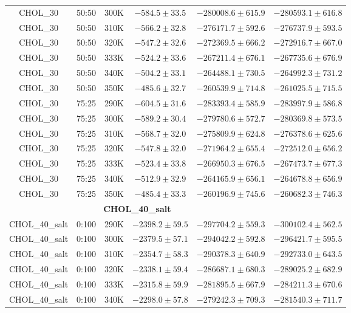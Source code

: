 \begin{longtable}{|c|c|c|c|c|c|}
CHOL\_30 & 50:50 & 300K & $-584.5 \pm 33.5$ & $-280008.6 \pm 615.9$ & $-280593.1 \pm 616.8$ \\
CHOL\_30 & 50:50 & 310K & $-566.2 \pm 32.8$ & $-276171.7 \pm 592.6$ & $-276737.9 \pm 593.5$ \\
CHOL\_30 & 50:50 & 320K & $-547.2 \pm 32.6$ & $-272369.5 \pm 666.2$ & $-272916.7 \pm 667.0$ \\
CHOL\_30 & 50:50 & 333K & $-524.2 \pm 33.6$ & $-267211.4 \pm 676.1$ & $-267735.6 \pm 676.9$ \\
CHOL\_30 & 50:50 & 340K & $-504.2 \pm 33.1$ & $-264488.1 \pm 730.5$ & $-264992.3 \pm 731.2$ \\
CHOL\_30 & 50:50 & 350K & $-485.6 \pm 32.7$ & $-260539.9 \pm 714.8$ & $-261025.5 \pm 715.5$ \\
CHOL\_30 & 75:25 & 290K & $-604.5 \pm 31.6$ & $-283393.4 \pm 585.9$ & $-283997.9 \pm 586.8$ \\
CHOL\_30 & 75:25 & 300K & $-589.2 \pm 30.4$ & $-279780.6 \pm 572.7$ & $-280369.8 \pm 573.5$ \\
CHOL\_30 & 75:25 & 310K & $-568.7 \pm 32.0$ & $-275809.9 \pm 624.8$ & $-276378.6 \pm 625.6$ \\
CHOL\_30 & 75:25 & 320K & $-547.8 \pm 32.0$ & $-271964.2 \pm 655.4$ & $-272512.0 \pm 656.2$ \\
CHOL\_30 & 75:25 & 333K & $-523.4 \pm 33.8$ & $-266950.3 \pm 676.5$ & $-267473.7 \pm 677.3$ \\
CHOL\_30 & 75:25 & 340K & $-512.9 \pm 32.9$ & $-264165.9 \pm 656.1$ & $-264678.8 \pm 656.9$ \\
CHOL\_30 & 75:25 & 350K & $-485.4 \pm 33.3$ & $-260196.9 \pm 745.6$ & $-260682.3 \pm 746.3$ \\
\midrule \multicolumn{5}{c}{\textbf{CHOL\_40\_salt}} \\ \midrule
CHOL\_40\_salt & 0:100 & 290K & $-2398.2 \pm 59.5$ & $-297704.2 \pm 559.3$ & $-300102.4 \pm 562.5$ \\
CHOL\_40\_salt & 0:100 & 300K & $-2379.5 \pm 57.1$ & $-294042.2 \pm 592.8$ & $-296421.7 \pm 595.5$ \\
CHOL\_40\_salt & 0:100 & 310K & $-2354.7 \pm 58.3$ & $-290378.3 \pm 640.9$ & $-292733.0 \pm 643.5$ \\
CHOL\_40\_salt & 0:100 & 320K & $-2338.1 \pm 59.4$ & $-286687.1 \pm 680.3$ & $-289025.2 \pm 682.9$ \\
CHOL\_40\_salt & 0:100 & 333K & $-2315.8 \pm 59.9$ & $-281895.5 \pm 667.9$ & $-284211.3 \pm 670.6$ \\
CHOL\_40\_salt & 0:100 & 340K & $-2298.0 \pm 57.8$ & $-279242.3 \pm 709.3$ & $-281540.3 \pm 711.7$ \\

\end{longtable}
